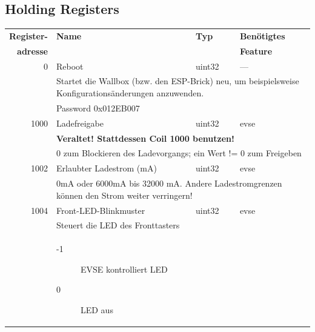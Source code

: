 \documentclass[a4paper,10pt]{article}
\newcommand{\tdesc}[1]{\multicolumn{3}{l}{\footnotesize #1}}
\begin{document}
\subsection{Holding Registers}
\begin{tabularx}{\textwidth}{rXll} \toprule
    \textbf{Register-} & \textbf{Name} & \textbf{Typ} & \textbf{Benötigtes}                                                     \\
    \textbf{adresse}   &      &     & \textbf{Feature}                                                                          \\ \midrule
0             & Reboot                                  & uint32       & ---                                                    \\
              & \tdesc{Startet die Wallbox (bzw. den ESP-Brick) neu, um beispielsweise Konfigurationsänderungen anzuwenden.}    \\
              & \tdesc{Password 0x012EB007}                                                                                     \\ \cmidrule{2-4}
1000          & Ladefreigabe                            & uint32       & evse                                                   \\
              & \tdesc{\textbf{Veraltet! Stattdessen Coil 1000 benutzen!}}                                                      \\
              & \tdesc{0 zum Blockieren des Ladevorgangs; ein Wert != 0 zum Freigeben}                                          \\ \cmidrule{2-4}
1002          & Erlaubter Ladestrom (mA)                & uint32       & evse                                                   \\
              & \tdesc{0mA oder 6000mA bis 32000 mA. Andere Ladestromgrenzen können den Strom weiter verringern!}               \\ \cmidrule{2-4}
1004          & Front-LED-Blinkmuster                   & uint32       & evse                                                   \\
              & \tdesc{Steuert die LED des Fronttasters}                                                                        \\
              & \begin{description}
                    \item[-1] EVSE kontrolliert LED
                    \item[0] LED aus

\end{description}
\end{tabularx}
\end{document}
